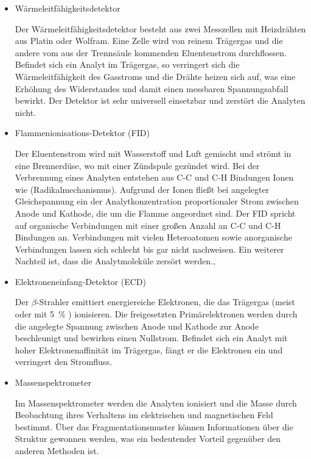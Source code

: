         \begin{itemize}
          \item Wärmeleitfähigkeitsdetektor
      
      Der Wärmeleitfähigkeitsdetektor besteht aus zwei Messzellen mit Heizdrähten aus Platin oder Wolfram. Eine Zelle wird von reinem Trägergas und die andere vom aus der Trennsäule kommenden Eluentenstrom durchflossen. Befindet sich ein Analyt im Trägergas, so verringert sich die Wärmeleitfähigkeit des Gasstroms und die Drähte heizen sich auf, was eine Erhöhung des Widerstandes und damit einen messbaren Spannungsabfall bewirkt. Der Detektor ist sehr universell einsetzbar und zerstört die Analyten nicht. \citep[S. 170]{Taschenatlas}
      
          \item Flammenionisations-Detektor (FID)
      
      
      Der Eluentenstrom wird mit Wasserstoff und Luft gemischt und strömt in eine Brennerdüse, wo mit einer Zündspule gezündet wird. Bei der Verbrennung eines Analyten entstehen aus C-C und C-H Bindungen Ionen wie  (Radikalmechanismus). Aufgrund der Ionen fließt bei angelegter Gleichspannung ein der Analytkonzentration proportionaler Strom zwischen Anode und Kathode, die um die Flamme angeordnet sind. Der FID spricht auf organische Verbindungen mit einer großen Anzahl an C-C und C-H Bindungen an. Verbindungen mit vielen Heteroatomen sowie anorganische Verbindungen lassen sich schlecht bis gar nicht nachweisen. Ein weiterer Nachteil ist, dass die Analytmoleküle zersört werden.\citep{Versuchsvorschrift}, \citep[S. 172]{Taschenatlas}
     
                 
          \item Elektroneneinfang-Detektor (ECD)
          
      Der $\beta$-Strahler  emittiert energiereiche Elektronen, die das Trägergas (meist  oder  mit \SI[mode=text]{5}{\percent} ) ionisieren. Die freigesetzten Primärelektronen werden durch die angelegte Spannung zwischen Anode und Kathode zur Anode beschleunigt und bewirken einen Nullstrom. Befindet sich ein Analyt mit hoher Elektronenaffinität im Trägergas, fängt er die Elektronen ein und verringert den Stromfluss. \citep{Versuchsvorschrift}
      
          \item Massenspektrometer
      
      Im Massenspektrometer werden die Analyten ionisiert und die Masse durch Beobachtung ihres Verhaltens im elektrischen und magnetischen Feld bestimmt. Über das Fragmentationsmuster können Informationen über die Struktur gewonnen werden, was ein bedeutender Vorteil gegenüber den anderen Methoden ist. \citep{Versuchsvorschrift}
      
        \end{itemize}


